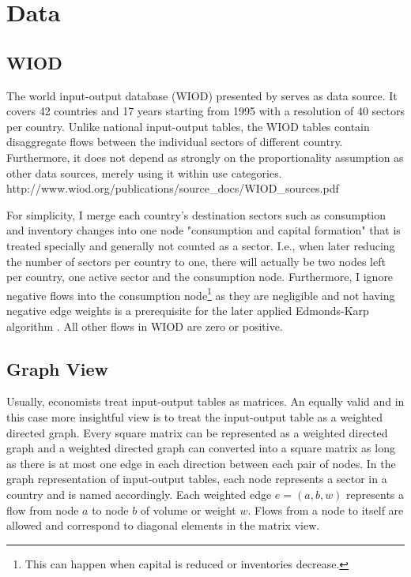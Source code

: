 \documentclass{paper}
\begin{document}
\section{Data}
\label{sec:data}
\subsection{WIOD}
The world input-output database (WIOD) presented by \cite{timmer2012world} serves as data source. It covers 42 countries and 17 years starting from 1995 with a resolution of 40 sectors per country. Unlike national input-output tables, the WIOD tables contain disaggregate flows between the individual sectors of different country. Furthermore, it does not depend as strongly on the proportionality assumption as other data sources, merely using it within use categories.
http://www.wiod.org/publications/source_docs/WIOD_sources.pdf

For simplicity, I merge each country's destination sectors such as consumption and inventory changes into one node "consumption and capital formation" that is treated specially and generally not counted as a sector. I.e., when later reducing the number of sectors per country to one, there will actually be two nodes left per country, one active sector and the consumption node. Furthermore, I ignore negative flows into the consumption node\footnote{This can happen when capital is reduced or inventories decrease.} as they are negligible and not having negative edge weights is a prerequisite for the later applied Edmonds-Karp algorithm \cite{edmonds1972theoretical}. All other flows in WIOD are zero or positive.

\subsection{Graph View}
\label{sec:graphview}
Usually, economists treat input-output tables as matrices. An equally valid and in this case more insightful view is to treat the input-output table as a weighted directed graph. Every square matrix can be represented as a weighted directed graph and a weighted directed graph can converted into a square matrix as long as there is at most one edge in each direction between each pair of nodes. In the graph representation of input-output tables, each node represents a sector in a country and is named accordingly. Each weighted edge $e=(a, b, w)$ represents a flow from node $a$ to node $b$ of volume or weight $w$. Flows from a node to itself are allowed and correspond to diagonal elements in the matrix view.
\end{document}
